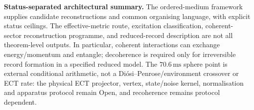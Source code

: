 \documentclass[11pt,a4paper]{article}
\begin{document}
\textbf{Status-separated architectural summary.}
The ordered-medium framework supplies candidate reconstructions and common
organising language, with explicit status ceilings.  The effective-metric
route, excitation classification, coherent-sector reconstruction programme,
and reduced-record description are not all theorem-level outputs.  In
particular, coherent interactions can exchange energy/momentum and entangle;
decoherence is required only for irreversible record formation in a specified
reduced model.  The $70.6\,\mathrm{ms}$ sphere point is external conditional
arithmetic, not a Diósi--Penrose/environment crossover or ECT rate: the
physical ECT projector, vertex, state/noise kernel, normalisation and apparatus
protocol remain Open, and recoherence remains protocol dependent.

\small
\renewcommand{\arraystretch}{1.12}
\end{document}
